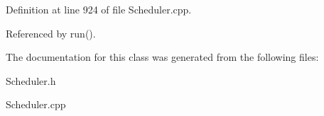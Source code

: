 Definition at line 924 of file Scheduler.\-cpp.



Referenced by run().



The documentation for this class was generated from the following files\-:\begin{DoxyCompactItemize}
\item 
Scheduler.\-h\item 
Scheduler.\-cpp\end{DoxyCompactItemize}
